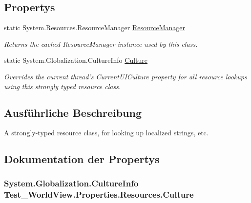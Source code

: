 \subsection*{Propertys}
\begin{DoxyCompactItemize}
\item 
static System.Resources.ResourceManager \hyperlink{class_test___world_view_1_1_properties_1_1_resources_a030f479acecce15ea7ca1f40437089af}{ResourceManager}
\begin{DoxyCompactList}\small\item\em Returns the cached ResourceManager instance used by this class. \item\end{DoxyCompactList}\item 
static System.Globalization.CultureInfo \hyperlink{class_test___world_view_1_1_properties_1_1_resources_a8630f1d69f4363920d6515b0b18a8704}{Culture}
\begin{DoxyCompactList}\small\item\em Overrides the current thread's CurrentUICulture property for all resource lookups using this strongly typed resource class. \item\end{DoxyCompactList}\end{DoxyCompactItemize}


\subsection{Ausführliche Beschreibung}
A strongly-\/typed resource class, for looking up localized strings, etc. 

\subsection{Dokumentation der Propertys}
\hypertarget{class_test___world_view_1_1_properties_1_1_resources_a8630f1d69f4363920d6515b0b18a8704}{
\subsubsection[{Culture}]{\setlength{\rightskip}{0pt plus 5cm}System.Globalization.CultureInfo Test\_\-WorldView.Properties.Resources.Culture}}
\label{class_test___world_view_1_1_properties_1_1_resources_a8630f1d69f4363920d6515b0b18a8704}



